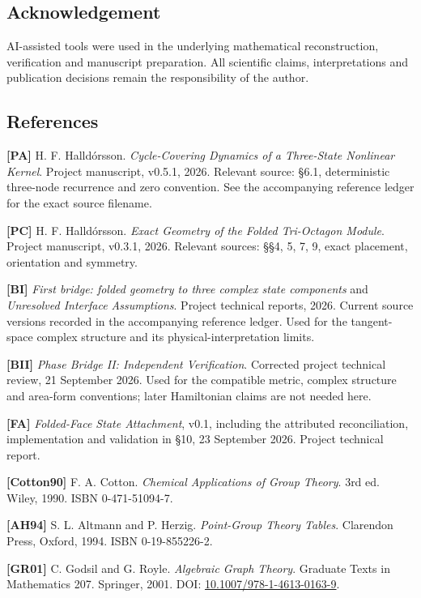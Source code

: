 \documentclass[
  11pt,
  a4paper,
]{article}
\begin{document}
\subsection{Acknowledgement}\label{acknowledgement}

AI-assisted tools were used in the underlying mathematical reconstruction, verification and manuscript preparation. All scientific claims, interpretations and publication decisions remain the responsibility of the author.

\subsection{References}\label{references}

\textbf{{[}PA{]}} H. F. Halldórsson. \emph{Cycle-Covering Dynamics of a Three-State Nonlinear Kernel}. Project manuscript, v0.5.1, 2026. Relevant source: §6.1, deterministic three-node recurrence and zero convention. See the accompanying reference ledger for the exact source filename.

\textbf{{[}PC{]}} H. F. Halldórsson. \emph{Exact Geometry of the Folded Tri-Octagon Module}. Project manuscript, v0.3.1, 2026. Relevant sources: §§4, 5, 7, 9, exact placement, orientation and symmetry.

\textbf{{[}BI{]}} \emph{First bridge: folded geometry to three complex state components} and \emph{Unresolved Interface Assumptions}. Project technical reports, 2026. Current source versions recorded in the accompanying reference ledger. Used for the tangent-space complex structure and its physical-interpretation limits.

\textbf{{[}BII{]}} \emph{Phase Bridge II: Independent Verification}. Corrected project technical review, 21 September 2026. Used for the compatible metric, complex structure and area-form conventions; later Hamiltonian claims are not needed here.

\textbf{{[}FA{]}} \emph{Folded-Face State Attachment}, v0.1, including the attributed reconciliation, implementation and validation in §10, 23 September 2026. Project technical report.

\textbf{{[}Cotton90{]}} F. A. Cotton. \emph{Chemical Applications of Group Theory}. 3rd ed. Wiley, 1990. ISBN 0-471-51094-7.

\textbf{{[}AH94{]}} S. L. Altmann and P. Herzig. \emph{Point-Group Theory Tables}. Clarendon Press, Oxford, 1994. ISBN 0-19-855226-2.

\textbf{{[}GR01{]}} C. Godsil and G. Royle. \emph{Algebraic Graph Theory}. Graduate Texts in Mathematics 207. Springer, 2001. DOI: \href{https://doi.org/10.1007/978-1-4613-0163-9}{10.1007/978-1-4613-0163-9}.
\end{document}
